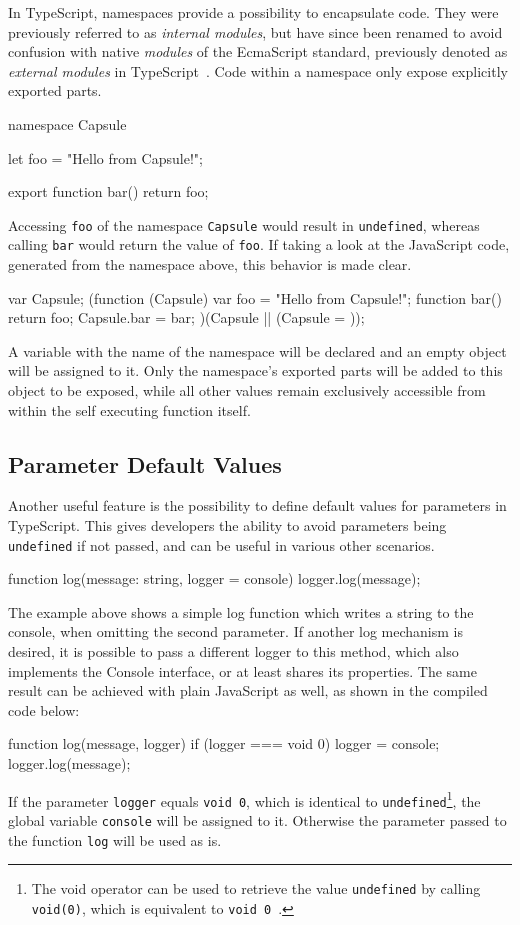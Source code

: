In TypeScript, namespaces provide a possibility to encapsulate code. They were previously referred to as \emph{internal modules}, but have since been renamed to avoid confusion with native \emph{modules} of the EcmaScript standard, previously denoted as \emph{external modules} in TypeScript~\cite{TypeScriptHandbook:Namespaces}. Code within a namespace only expose explicitly exported parts.
\begin{JsCode}[numbers=none]
namespace Capsule {
  let foo = "Hello from Capsule!";
  
  export function bar() {
    return foo;
  }
}
\end{JsCode}
Accessing \texttt{foo} of the namespace \texttt{Capsule} would result in \texttt{undefined}, whereas calling \texttt{bar} would return the value of \texttt{foo}. If taking a look at the JavaScript code, generated from the namespace above, this behavior is made clear.
\begin{JsCode}[numbers=none]
var Capsule;
(function (Capsule) {
    var foo = "Hello from Capsule!";
    function bar() {
        return foo;
    }
    Capsule.bar = bar;
})(Capsule || (Capsule = {}));
\end{JsCode}
A variable with the name of the namespace will be declared and an empty object will be assigned to it. Only the namespace's exported parts will be added to this object to be exposed, while all other values 
remain exclusively accessible from within the self executing function itself.

\subsection{Parameter Default Values}
\label{sec:ts-parameter-default-values}

Another useful feature is the possibility to define default values for parameters in TypeScript. This gives developers the ability to avoid parameters being \texttt{undefined} if not passed, and can be useful in various other scenarios.
\begin{JsCode}[numbers=none]
function log(message: string, logger = console) {
  logger.log(message);
}
\end{JsCode}
The example above shows a simple log function which writes a string to the console, when omitting the second parameter. If another log mechanism is desired, it is possible to pass a different logger to this method, which also implements the Console interface, or at least shares its properties.
The same result can be achieved with plain JavaScript as well, as shown in the compiled code below:
\begin{JsCode}[numbers=none]
function log(message, logger) {
    if (logger === void 0) { logger = console; }
    logger.log(message);
}
\end{JsCode}
If the parameter \texttt{logger} equals \texttt{void 0}, which is identical to \texttt{undefined}\footnote{The void operator can be used to retrieve the value \texttt{undefined} by calling \texttt{void(0)}, which is equivalent to \texttt{void 0}~\cite{void:MDN:2017}.}, the global variable \texttt{console} will be assigned to it. Otherwise the parameter passed to the function \texttt{log} will be used as is.

